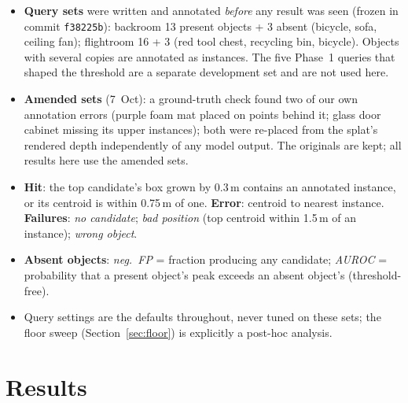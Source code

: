 \documentclass[11pt,a4paper]{article}
\newcommand{\code}[1]{\texttt{#1}}
\begin{document}
\begin{itemize}
  \item \textbf{Query sets} were written and annotated \emph{before} any result was seen (frozen in commit
        \code{f38225b}): backroom 13 present objects + 3 absent (bicycle, sofa, ceiling fan); flightroom 16 + 3 (red tool
        chest, recycling bin, bicycle). Objects with several copies are annotated as instances. The five Phase~1 queries
        that shaped the threshold are a separate development set and are not used here.
  \item \textbf{Amended sets} (7~Oct): a ground-truth check found two of our own annotation errors (purple foam mat
        placed on points behind it; glass door cabinet missing its upper instances); both were re-placed from the
        splat's rendered depth independently of any model output. The originals are kept; all results here use the
        amended sets.
  \item \textbf{Hit}: the top candidate's box grown by 0.3\,m contains an annotated instance, or its centroid is within
        0.75\,m of one. \textbf{Error}: centroid to nearest instance. \textbf{Failures}: \emph{no candidate};
        \emph{bad position} (top centroid within 1.5\,m of an instance); \emph{wrong object}.
  \item \textbf{Absent objects}: \emph{neg.\ FP} = fraction producing any candidate; \emph{AUROC} = probability that a
        present object's peak exceeds an absent object's (threshold-free).
  \item Query settings are the defaults throughout, never tuned on these sets; the floor sweep
        (Section~\ref{sec:floor}) is explicitly a post-hoc analysis.
\end{itemize}

\section{Results}
\end{document}
